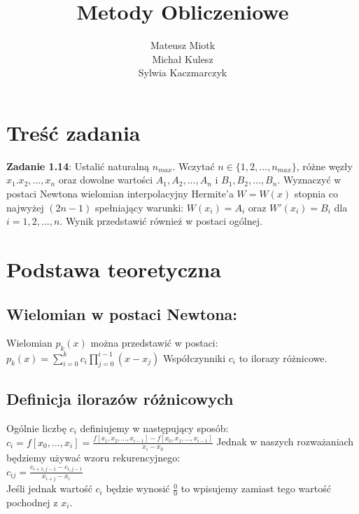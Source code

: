 \documentclass[16pt]{article} %
\title{Metody Obliczeniowe}
\author{Mateusz Miotk\\ Michał Kulesz\\ Sylwia Kaczmarczyk}
\date{} %
\begin{document}
\maketitle

\section{Treść zadania}

\textbf {Zadanie 1.14}: Ustalić naturalną $n_{max}$. Wczytać $ n \in \lbrace1,2,...,n_{max}\rbrace$, różne węzły $x_1.x_2,...,x_n $ oraz 
dowolne wartości $A_1,A_2,...,A_n$ i $B_1,B_2,...,B_n $. Wyznaczyć w postaci Newtona wielomian interpolacyjny Hermite'a $W = W(x)$ stopnia co najwyżej
$(2n-1)$ spełniający warunki: $W(x_i) = A_i$ oraz $W'(x_i) = B_i$ dla $i = 1,2,...,n$. Wynik przedstawić również w postaci ogólnej.

\section{Podstawa teoretyczna}
\subsection {Wielomian w postaci Newtona:}
Wielomian $p_k(x)$ można przedstawić w postaci:\\
$p_k(x) = \sum_{i=0}^{k} c_i \prod_{j=0}^{i-1} (x-x_j)$
Współczynniki $c_i$ to ilorazy różnicowe.

\subsection {Definicja ilorazów różnicowych}

Ogólnie liczbę $c_i$ definiujemy w następujący sposób:\\
$c_i = f[x_0,...,x_i] = \frac {f[x_1,x_2,...,x_{i-1}]-f[x_0,x_1,...,x_{i-1}]} {x_i - x_0}$
Jednak w naszych rozważaniach będziemy używać wzoru rekurencyjnego:\\
$c_{ij} = \frac {c_{i+1,j-1}- c_{i,j-1}} {x_{i+j}-x_i}$\\
Jeśli jednak wartość $c_i$ będzie wynosić $\frac{0}{0}$ to wpisujemy zamiast tego wartość pochodnej z $x_i$.
\\\\
\end{document}
